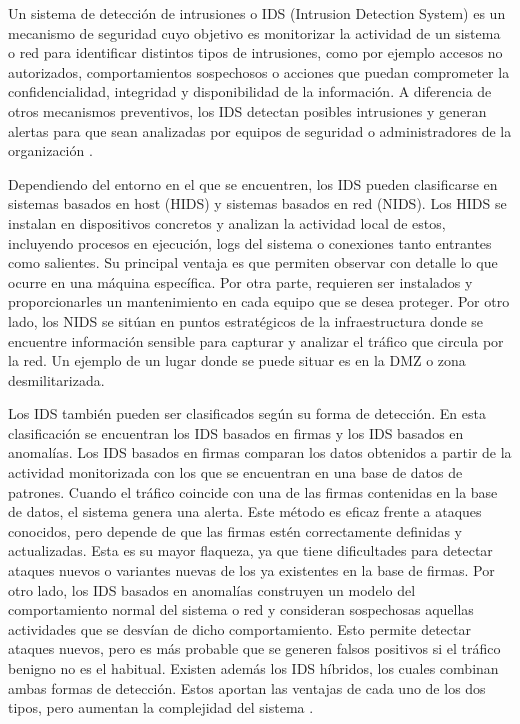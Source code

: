 Un sistema de detección de intrusiones o IDS (Intrusion Detection System) es un mecanismo de seguridad cuyo objetivo es monitorizar la actividad de un sistema o red para identificar distintos tipos de intrusiones, como por ejemplo accesos no autorizados, comportamientos sospechosos o acciones que puedan comprometer la confidencialidad, integridad y disponibilidad de la información. A diferencia de otros mecanismos preventivos, los IDS detectan posibles intrusiones y generan alertas para que sean analizadas por equipos de seguridad o administradores de la organización \cite{abdulganiyu2023systematic}.

Dependiendo del entorno en el que se encuentren, los IDS pueden clasificarse en sistemas basados en host (HIDS) y sistemas basados en red (NIDS). Los HIDS se instalan en dispositivos concretos y analizan la actividad local de estos, incluyendo procesos en ejecución, logs del sistema o conexiones tanto entrantes como salientes. Su principal ventaja es que permiten observar con detalle lo que ocurre en una máquina específica. Por otra parte, requieren ser instalados y proporcionarles un mantenimiento en cada equipo que se desea proteger. Por otro lado, los NIDS se sitúan en puntos estratégicos de la infraestructura donde se encuentre información sensible para capturar y analizar el tráfico que circula por la red. Un ejemplo de un lugar donde se puede situar es en la DMZ o zona desmilitarizada.

Los IDS también pueden ser clasificados según su forma de detección. En esta clasificación se encuentran los IDS basados en firmas y los IDS basados en anomalías. Los IDS basados en firmas comparan los datos obtenidos a partir de la actividad monitorizada con los que se encuentran en una base de datos de patrones. Cuando el tráfico coincide con una de las firmas contenidas en la base de datos, el sistema genera una alerta. Este método es eficaz frente a ataques conocidos, pero depende de que las firmas estén correctamente definidas y actualizadas. Esta es su mayor flaqueza, ya que tiene dificultades para detectar ataques nuevos o variantes nuevas de los ya existentes en la base de firmas. Por otro lado, los IDS basados en anomalías construyen un modelo del comportamiento normal del sistema o red y consideran sospechosas aquellas actividades que se desvían de dicho comportamiento. Esto permite detectar ataques nuevos, pero es más probable que se generen falsos positivos si el tráfico benigno no es el habitual. Existen además los IDS híbridos, los cuales combinan ambas formas de detección. Estos aportan las ventajas de cada uno de los dos tipos, pero aumentan la complejidad del sistema \cite{abdulganiyu2023systematic,kunal2019mlids}.

